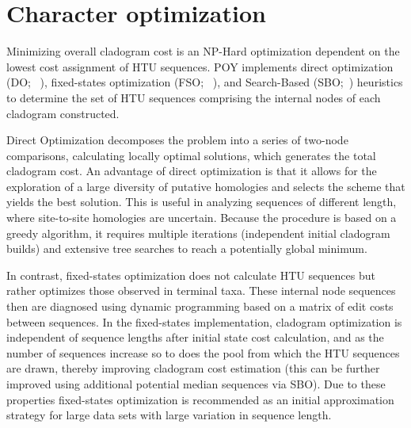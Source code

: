 
\section{Character optimization}
Minimizing overall cladogram cost is an NP-Hard optimization dependent on the lowest cost assignment of HTU sequences.  
POY implements direct optimization (DO; ~\cite{wheeler1996}), fixed-states optimization (FSO; ~\cite{wheeler1999a}), 
and Search-Based (SBO;~\cite{wheeler2003b}) heuristics to determine the set of HTU sequences comprising the internal 
nodes of each cladogram constructed.  

Direct Optimization decomposes the problem into a series of two-node comparisons, 
calculating locally optimal solutions, which generates the total cladogram cost.  An advantage of direct optimization is that it 
allows for the exploration of a large diversity of putative homologies and selects the scheme that yields the best 
solution. This is useful in analyzing sequences of different length, where site-to-site homologies are uncertain.  Because the 
procedure is based on a greedy algorithm, it requires multiple iterations (independent initial cladogram builds) and extensive 
tree searches to reach a potentially global minimum.  

In contrast, fixed-states optimization does not calculate HTU sequences 
but rather optimizes those observed in terminal taxa. These internal node sequences then are diagnosed using dynamic 
programming based on a matrix of edit costs between sequences.  In the fixed-states implementation, cladogram optimization 
is independent of sequence lengths after initial state cost calculation, and as the number of sequences increase so to does the pool from which the HTU 
sequences are drawn, thereby improving cladogram cost estimation (this can be further improved using additional potential 
median sequences via SBO). 
Due to these properties fixed-states optimization is recommended as an initial approximation strategy for large data sets 
with large variation in sequence length.  


